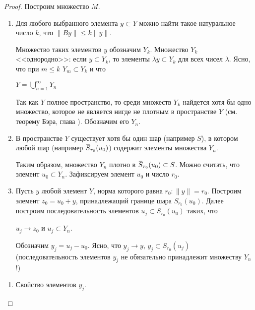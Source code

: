 \documentclass[12pt,a4paper,titlepage,oneside]{book}
\newcommand{\overbar}[1]{\mkern 1.5mu\overline{\mkern-1.5mu#1\mkern-1.5mu}\mkern 1.5mu}
\theoremstyle{definition}
\theoremstyle{plain}
\theoremstyle{remark}
\theoremstyle{remark}
\theoremstyle{remark}
\theoremstyle{remark}
\theoremstyle{plain}
\theoremstyle{plain}
\begin{document}
\begin{proof}
	
Построим множество $M$.

\begin{enumerate}
	\item Для любого выбранного элемента $y \subset Y$ можно найти такое натуральное число $k$, что $\lVert By\rVert \leqslant k\lVert y\rVert$.
	
	Множество таких элементов $y$ обозначим $Y_k$. Множество $Y_k$ <<однородно>>: если $y \subset Y_k$, то элементы $\lambda y \subset Y_k$ для всех чисел $\lambda$. Ясно, что при $m \leqslant k$ $Y_m \subset Y_k$ и что

\begin{center}	

	$Y=\bigcup\limits_{n=1}^\infty Y_n$
	
\end{center}
	
	Так как $Y$ полное пространство, то среди множеств $Y_k$ найдется хотя бы одно множество, которое не является нигде не плотным в пространстве $Y$ (см. теорему Бэра, глава \uppercase\expandafter{}). Обозначим его $Y_n$.
	
	\item В пространстве $Y$ существует хотя бы один шар (например $S$), в котором любой шар (например $\overbar{S}_{r_0}(u_0)$) содержит элементы множества $Y_n$.
	
	Таким образом, множество $Y_n$ плотно в $\overbar{S}_{r_0}(u_0)\subset S$. Можно считать, что элемент $u_0 \subset Y_n$. Зафиксируем элемент $u_0$ и число $r_0$.
	
	\item Пусть $y$ любой элемент $Y$, норма которого равна $r_0:\lVert y\rVert=r_0$. Построим элемент $z_0=u_0+y$, принадлежащий границе шара $S_{r_0}(u_0)$. Далее построим последовательность элементов $u_j \subset S_{r_0}(u_0)$ таких, что

\begin{center}	

	$u_j \to z_0$ и $u_j \subset Y_n$.
	
\end{center}

Обозначим $y_j=u_j-u_0$. Ясно, что $y_j \to y$, $y_j \subset S_{r_0}(u_j)$ (последовательность элементов $y_j$ не обязательно принадлежит множеству $Y_n$!)
	
\end{enumerate}


\begin{enumerate}
\item Свойство элементов $y_j$.


\end{enumerate}
\end{proof}
\end{document}
